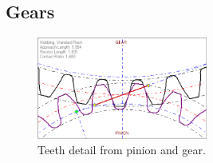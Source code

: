 \subsection{Gears} %
\label{sub:gears}

\begin{figure}[ht!]
  \centering
  \includegraphics[width=0.5\textwidth]{figures/hip_gears}
  \caption{Teeth detail from pinion and gear.}
  \label{fig:teeth_detail}
\end{figure}

